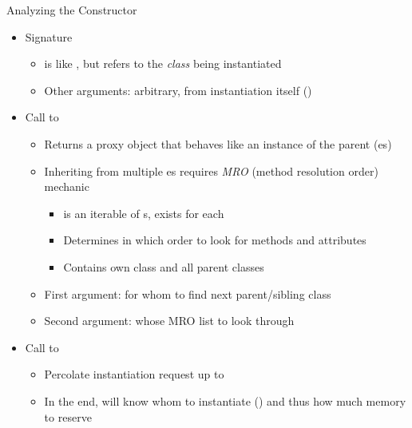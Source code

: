 \begin{frame}{Analyzing the Constructor}
%
\begin{itemize}
\item Signature 
	\begin{itemize}
	\item {} is like , but refers to the \emph{class} being instantiated
	\item Other arguments: arbitrary, from instantiation itself ()
	\end{itemize}
\item Call to 
	\begin{itemize}
	\item Returns a proxy object that behaves like an instance of the parent (es)
	\item Inheriting from multiple es requires \emph{MRO} (method resolution order) mechanic
		\begin{itemize}
		\item {} is an iterable of s, exists for each 
		\item Determines in which order to look for methods and attributes
		\item Contains own class and all parent classes
		\end{itemize}
	\item First argument: for whom to find next parent/sibling class
	\item Second argument: whose MRO list to look through
	\end{itemize}
\item Call to 
	\begin{itemize}
	\item Percolate instantiation request up to 
	\item In the end,  will know whom to instantiate () and thus how much memory to reserve
	\end{itemize}
\end{itemize}
%
\end{frame}


